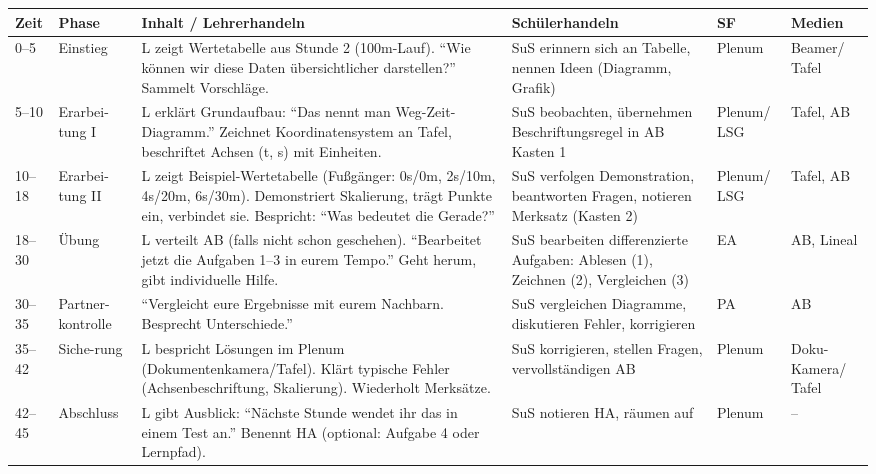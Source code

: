 \documentclass[11pt,a4paper]{article}
\begin{document}
\begin{longtable}{|p{0.8cm}|p{1.4cm}|p{4.2cm}|p{3cm}|p{1.5cm}|p{1.8cm}|}
\hline
\textbf{Zeit} & \textbf{Phase} & \textbf{Inhalt / Lehrerhandeln} & \textbf{Schülerhandeln} & \textbf{SF} & \textbf{Medien} \\
\hline
\endhead

0--5 & Einstieg & L zeigt Wertetabelle aus Stunde 2 (100m-Lauf). ``Wie können wir diese Daten übersichtlicher darstellen?'' Sammelt Vorschläge. & SuS erinnern sich an Tabelle, nennen Ideen (Diagramm, Grafik) & Plenum & Beamer/ Tafel \\
\hline

5--10 & Erarbei-tung I & L erklärt Grundaufbau: ``Das nennt man Weg-Zeit-Diagramm.'' Zeichnet Koordinatensystem an Tafel, beschriftet Achsen (t, s) mit Einheiten. & SuS beobachten, übernehmen Beschriftungsregel in AB Kasten 1 & Plenum/ LSG & Tafel, AB \\
\hline

10--18 & Erarbei-tung II & L zeigt Beispiel-Wertetabelle (Fußgänger: 0s/0m, 2s/10m, 4s/20m, 6s/30m). Demonstriert Skalierung, trägt Punkte ein, verbindet sie. Bespricht: ``Was bedeutet die Gerade?'' & SuS verfolgen Demonstration, beantworten Fragen, notieren Merksatz (Kasten 2) & Plenum/ LSG & Tafel, AB \\
\hline

18--30 & Übung & L verteilt AB (falls nicht schon geschehen). ``Bearbeitet jetzt die Aufgaben 1--3 in eurem Tempo.'' Geht herum, gibt individuelle Hilfe. & SuS bearbeiten differenzierte Aufgaben: Ablesen (1), Zeichnen (2), Vergleichen (3) & EA & AB, Lineal \\
\hline

30--35 & Partner-kontrolle & ``Vergleicht eure Ergebnisse mit eurem Nachbarn. Besprecht Unterschiede.'' & SuS vergleichen Diagramme, diskutieren Fehler, korrigieren & PA & AB \\
\hline

35--42 & Siche-rung & L bespricht Lösungen im Plenum (Dokumentenkamera/Tafel). Klärt typische Fehler (Achsenbeschriftung, Skalierung). Wiederholt Merksätze. & SuS korrigieren, stellen Fragen, vervollständigen AB & Plenum & Doku-Kamera/ Tafel \\
\hline

42--45 & Abschluss & L gibt Ausblick: ``Nächste Stunde wendet ihr das in einem Test an.'' Benennt HA (optional: Aufgabe 4 oder Lernpfad). & SuS notieren HA, räumen auf & Plenum & -- \\
\hline
\end{longtable}
\end{document}
